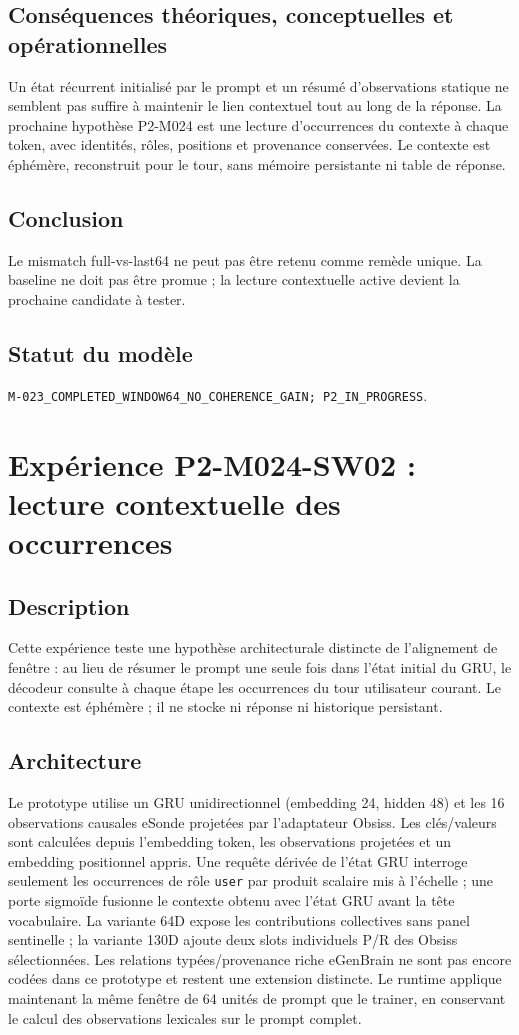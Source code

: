 \documentclass[11pt,a4paper]{report}
\begin{document}
\subsection*{Conséquences théoriques, conceptuelles et opérationnelles}
Un état récurrent initialisé par le prompt et un résumé d'observations statique ne semblent pas suffire à maintenir le lien contextuel tout au long de la réponse. La prochaine hypothèse P2-M024 est une lecture d'occurrences du contexte à chaque token, avec identités, rôles, positions et provenance conservées. Le contexte est éphémère, reconstruit pour le tour, sans mémoire persistante ni table de réponse.
\subsection*{Conclusion}
Le mismatch full-vs-last64 ne peut pas être retenu comme remède unique. La baseline ne doit pas être promue ; la lecture contextuelle active devient la prochaine candidate à tester.
\subsection*{Statut du modèle}
\texttt{M-023\_COMPLETED\_WINDOW64\_NO\_COHERENCE\_GAIN; P2\_IN\_PROGRESS}.

\section*{Expérience P2-M024-SW02 : lecture contextuelle des occurrences}
\subsection*{Description}
Cette expérience teste une hypothèse architecturale distincte de l'alignement de fenêtre : au lieu de résumer le prompt une seule fois dans l'état initial du GRU, le décodeur consulte à chaque étape les occurrences du tour utilisateur courant. Le contexte est éphémère ; il ne stocke ni réponse ni historique persistant.

\subsection*{Architecture}
Le prototype utilise un GRU unidirectionnel (embedding 24, hidden 48) et les 16 observations causales eSonde projetées par l'adaptateur Obsiss. Les clés/valeurs sont calculées depuis l'embedding token, les observations projetées et un embedding positionnel appris. Une requête dérivée de l'état GRU interroge seulement les occurrences de rôle \texttt{user} par produit scalaire mis à l'échelle ; une porte sigmoïde fusionne le contexte obtenu avec l'état GRU avant la tête vocabulaire. La variante 64D expose les contributions collectives sans panel sentinelle ; la variante 130D ajoute deux slots individuels P/R des Obsiss sélectionnées. Les relations typées/provenance riche eGenBrain ne sont pas encore codées dans ce prototype et restent une extension distincte. Le runtime applique maintenant la même fenêtre de 64 unités de prompt que le trainer, en conservant le calcul des observations lexicales sur le prompt complet.
\end{document}
